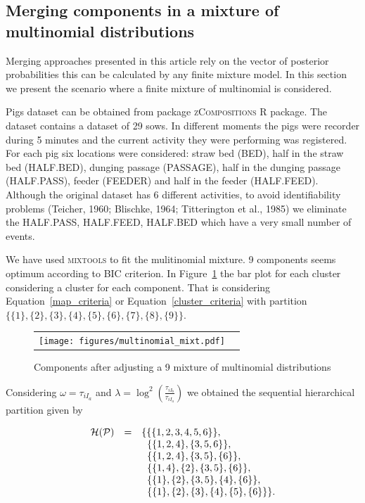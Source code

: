 \documentclass[10pt, a4paper]{article}
\begin{document}
\begin{spacing}{1.9}
\section{Merging components in a mixture of multinomial distributions}

Merging approaches presented in this article rely on the vector of posterior probabilities this can be calculated by any finite mixture model. In this section we present the scenario where a finite mixture of multinomial is considered.

Pigs dataset can be obtained from package \textsc{zCompositions} R package. The dataset contains a dataset of 29 sows. In different moments the pigs were recorder during 5 minutes and the current activity they were performing was registered. For each pig six locations were considered: straw bed (BED), half in the straw bed (HALF.BED), dunging passage (PASSAGE), half in the dunging passage (HALF.PASS), feeder (FEEDER) and half in the feeder (HALF.FEED). Although the original dataset has 6 different activities, to avoid identifiability problems (Teicher, 1960; Blischke, 1964; Titterington et al., 1985) we eliminate the HALF.PASS, HALF.FEED, HALF.BED which have a very small number of events.

We have used \textsc{mixtools} to fit the mulitinomial mixture. 9 components seems optimum according to BIC criterion. In Figure~\ref{multinomial_mixture} the bar plot for each cluster considering a cluster for each component. That is considering Equation~\ref{map_criteria} or Equation~\ref{cluster_criteria} with partition $\{\{1\}, \{2\}, \{3\}, \{4\}, \{5\}, \{6\}, \{7\}, \{8\}, \{9\} \}$.

\begin{figure}[t]
\begin{center}
\begin{tabular}{cc}
  \texttt{[image: figures/multinomial\_mixt.pdf]} \\
 \end{tabular}
 \caption{Components after adjusting a 9 mixture of multinomial distributions}\label{multinomial_mixture}
\end{center}
\end{figure}

Considering $\omega = \tau_{i I_a}$ and $\lambda = \log^2 \left(\frac{ \tau_{iI_b} }{ \tau_{iI_a} }\right)$ we obtained the sequential hierarchical partition given by


\begin{equation}
\begin{array}{r c l}
\mathcal{H}(\mathcal{P}) &=& \{ \{ \{1,2,3,4,5,6\}\}, \\ 
 & & \;\; \{\{1,2,4\},\{3,5,6\}\}, \\ 
 & & \;\; \{\{1,2,4\},\{3,5\},\{6\}\}, \\ 
 & & \;\; \{\{1,4\},\{2\},\{3,5\},\{6\}\}, \\ 
 & & \;\; \{\{1\},\{2\},\{3,5\},\{4\},\{6\}\}, \\ 
 & & \;\; \{\{1\},\{2\},\{3\},\{4\},\{5\},\{6\} \} \}.
\end{array}
\label{hier_ex_multinomial}
\end{equation}


\end{spacing}
\end{document}
